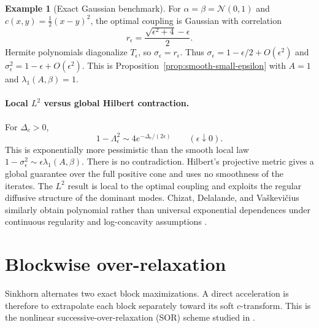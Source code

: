 \documentclass[11pt]{article}
\theoremstyle{definition}
\newtheorem{example}[proposition]{Example}
\theoremstyle{remark}
\newcommand{\eps}{\epsilon}
\newcommand{\al}{\alpha}
\newcommand{\be}{\beta}
\newcommand{\Gaussian}{\mathcal{N}}
\begin{document}
\begin{example}[Exact Gaussian benchmark]
  \label{ex:gaussian-benchmark}
  For $\al=\be=\Gaussian(0,1)$ and
  $c(x,y)=\frac12(x-y)^2$, the optimal coupling is Gaussian with
  correlation
  \begin{equation}
    \label{eq:gaussian-correlation}
    r_\eps
    =
    \frac{\sqrt{\eps^2+4}-\eps}{2}.
  \end{equation}
  Hermite polynomials diagonalize $T_\eps$, so $\sigma_\eps=r_\eps$.
  Thus $\sigma_\eps=1-\eps/2+O(\eps^2)$ and
  $\sigma_\eps^2=1-\eps+O(\eps^2)$. This is
  Proposition~\ref{prop:smooth-small-epsilon} with
  $A=1$ and $\lambda_1(A,\be)=1$.
\end{example}

\paragraph{Local $L^2$ versus global Hilbert contraction.}
For $\Delta_c>0$,
\begin{equation}
  \label{eq:hilbert-small-epsilon}
  1-\Lambda_\eps^2
  \sim
  4e^{-\Delta_c/(2\eps)}
  \qquad(\eps\downarrow0).
\end{equation}
This is exponentially more pessimistic than the smooth local law
$1-\sigma_\eps^2\sim\eps\lambda_1(A,\be)$. There is no contradiction.
Hilbert's projective metric gives a global guarantee over the full positive cone and uses
no smoothness of the iterates. The $L^2$ result is local to the optimal
coupling and exploits the regular diffusive structure of the dominant
modes. Chizat, Delalande, and Va\v{s}kevi\v{c}ius similarly obtain
polynomial rather than universal exponential dependences under
continuous regularity and log-concavity assumptions
\cite{ChizatDelalandeVaskevicius2026}.

\section{Blockwise over-relaxation}
\label{sec:acceleration}

Sinkhorn alternates two exact block maximizations. A direct acceleration
is therefore to extrapolate each block separately toward its soft
$c$-transform. This is the nonlinear successive-over-relaxation (SOR)
scheme studied in
\cite{ThibaultEtAl2021,LehmannEtAl2022}.
\end{document}

